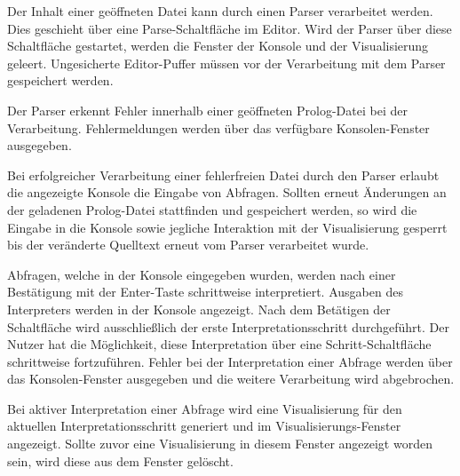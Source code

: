 \documentclass[parskip=full,11pt,twoside]{scrartcl}
\begin{document}

Der Inhalt einer geöffneten Datei kann durch einen Parser verarbeitet werden. Dies geschieht über eine Parse-Schaltfläche im Editor. Wird der Parser über diese Schaltfläche gestartet, werden die Fenster der Konsole und der Visualisierung geleert. Ungesicherte Editor-Puffer müssen vor der Verarbeitung mit dem Parser gespeichert werden.


Der Parser erkennt Fehler innerhalb einer geöffneten Prolog-Datei bei der Verarbeitung. Fehlermeldungen werden über das verfügbare Konsolen-Fenster ausgegeben.


Bei erfolgreicher Verarbeitung einer fehlerfreien Datei durch den Parser erlaubt die angezeigte Konsole die Eingabe von Abfragen. Sollten erneut Änderungen an der geladenen Prolog-Datei stattfinden und gespeichert werden, so wird die Eingabe in die Konsole sowie jegliche Interaktion mit der Visualisierung gesperrt bis der veränderte Quelltext erneut vom Parser verarbeitet wurde.


Abfragen, welche in der Konsole eingegeben wurden, werden nach einer Bestätigung mit der Enter-Taste schrittweise interpretiert. Ausgaben des Interpreters werden in der Konsole angezeigt. Nach dem Betätigen der Schaltfläche wird ausschließlich der erste Interpretationsschritt durchgeführt. Der Nutzer hat die Möglichkeit, diese Interpretation über eine Schritt-Schaltfläche schrittweise fortzuführen. Fehler bei der Interpretation einer Abfrage werden über das Konsolen-Fenster ausgegeben und die weitere Verarbeitung wird abgebrochen.


Bei aktiver Interpretation einer Abfrage wird eine Visualisierung für den aktuellen Interpretationsschritt generiert und im Visualisierungs-Fenster angezeigt. Sollte zuvor eine Visualisierung in diesem Fenster angezeigt worden sein, wird diese aus dem Fenster gelöscht.
\end{document}

